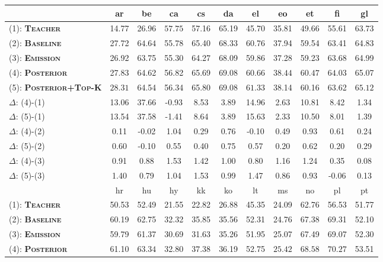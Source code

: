 \documentclass[11pt,a4paper]{article}
\begin{document}
\begin{table*}[t]
\centering
\small
\begin{tabular}{l|cccccccccc}
\hline
\hline
 &  ar & be & ca & cs & da & el & eo & et & fi & gl\\
 \hline
(1): {\bf\textsc{Teacher}}  & 14.77 & 26.96 & $\mathbf{57.75}$ & 57.16 & 65.19 & 45.70 & 35.81 & 49.66 & 55.61 & 63.73 \\
(2): {\bf\textsc{Baseline}}  & 27.72 & $\mathbf{64.64}$ & 55.78 & 65.40 & 68.33 & 60.76 & 37.94 & 59.54 & 63.41 & 64.83 \\
(3): {\bf\textsc{Emission}}  & 26.92 & 63.75 & 55.30 & 64.27 & 68.09 & 59.86 & 37.28 & 59.23 & 63.68 & 64.99 \\
(4): {\bf\textsc{Posterior}}  & 27.83 & 64.62 & 56.82 & 65.69 & $\mathbf{69.08}$ & 60.66 & $\mathbf{38.44}$ & $\mathbf{60.47}$ & $\mathbf{64.03}$ & 65.07 \\
(5): {\bf\textsc{Posterior+Top-K}}  & $\mathbf{28.31}$ & 64.54 & 56.34 & 65.80 & $\mathbf{69.08}$ & $\mathbf{61.33}$ & 38.14 & 60.16 & 63.62 & $\mathbf{65.12}$ \\
\hline
$\Delta$: (4)-(1) & 13.06 & 37.66 & -0.93 & 8.53 & 3.89 & 14.96 & 2.63 & 10.81 & 8.42 & 1.34 \\
$\Delta$: (5)-(1) & 13.54 & 37.58 & -1.41 & 8.64 & 3.89 & 15.63 & 2.33 & 10.50 & 8.01 & 1.39 \\
$\Delta$: (4)-(2) & 0.11 & -0.02 & 1.04 & 0.29 & 0.76 & -0.10 & 0.49 & 0.93 & 0.61 & 0.24 \\
$\Delta$: (5)-(2) & 0.60 & -0.10 & 0.55 & 0.40 & 0.75 & 0.57 & 0.20 & 0.62 & 0.20 & 0.29 \\
$\Delta$: (4)-(3) & 0.91 & 0.88 & 1.53 & 1.42 & 1.00 & 0.80 & 1.16 & 1.24 & 0.35 & 0.08 \\
$\Delta$: (5)-(3) & 1.40 & 0.79 & 1.04 & 1.53 & 0.99 & 1.47 & 0.86 & 0.93 & -0.06 & 0.13 \\
 \hline\hline
 & hr & hu & hy & kk & ko & lt & ms & no & pl & pt \\
 \hline
(1): {\bf\textsc{Teacher}}  & 50.53 & 52.49 & 21.55 & 22.82 & 26.88 & 45.35 & 24.09 & 62.76 & 56.53 & 51.77 \\
(2): {\bf\textsc{Baseline}}  & 60.19 & 62.75 & 32.32 & 35.85 & 35.56 & 52.31 & 24.76 & 67.38 & 69.31 & 52.10 \\
(3): {\bf\textsc{Emission}}  & 59.79 & 61.37 & 30.69 & 31.63 & 35.26 & 51.95 & 25.07 & 67.49 & 69.07 & 52.30 \\
(4): {\bf\textsc{Posterior}}  & 61.10 & $\mathbf{63.34}$ & 32.80 & $\mathbf{37.38}$ & 36.19 & 52.75 & $\mathbf{25.42}$ & $\mathbf{68.58}$ & $\mathbf{70.27}$ & 53.51 \\

\end{tabular}
\end{table*}
\end{document}
